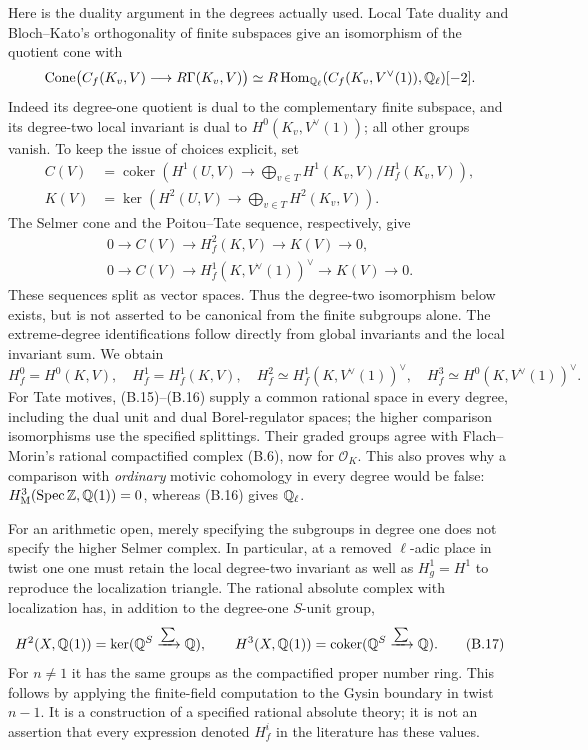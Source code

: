 Here is the duality argument in the degrees actually used.  Local
Tate duality and Bloch--Kato's orthogonality of finite subspaces
give an isomorphism of the quotient cone with
\[
 \operatorname{Cone}\bigl(C_f(K_v,V)\longrightarrow
   R\Gamma(K_v,V)\bigr)
 \simeq R\operatorname{Hom}_{\mathbb Q_\ell}
       (C_f(K_v,V^\vee(1)),\mathbb Q_\ell)[-2].
\]
Indeed its degree-one quotient is dual to the complementary finite
subspace, and its degree-two local invariant is dual to
\(H^0(K_v,V^\vee(1))\); all other groups vanish.
To keep the issue of choices explicit, set
\[
\begin{split}
 C(V)&=\operatorname{coker}\left(H^1(U,V)\longrightarrow
       \bigoplus_{v\in T}H^1(K_v,V)/H^1_f(K_v,V)\right),\\
 K(V)&=\ker\left(H^2(U,V)\longrightarrow
       \bigoplus_{v\in T}H^2(K_v,V)\right).
\end{split}
\]
The Selmer cone and the Poitou--Tate sequence, respectively, give
\[
\begin{gathered}
0\longrightarrow C(V)\longrightarrow H_f^2(K,V)
 \longrightarrow K(V)\longrightarrow0,\\
0\longrightarrow C(V)\longrightarrow
 H_f^1(K,V^\vee(1))^\vee
 \longrightarrow K(V)\longrightarrow0.
\end{gathered}
\]
These sequences split as vector spaces.  Thus the degree-two
isomorphism below exists, but is not asserted to be canonical
from the finite subgroups alone.  The extreme-degree
identifications follow directly from global invariants and the
local invariant sum.  We obtain
\[
 H_f^0=H^0(K,V),\quad H_f^1=H_f^1(K,V),\quad
 H_f^2\simeq H_f^1(K,V^\vee(1))^\vee,\quad
 H_f^3\simeq H^0(K,V^\vee(1))^\vee.\tag{B.16}
\]
For Tate motives, (B.15)--(B.16) supply a common rational space in
every degree, including the dual unit and dual Borel-regulator spaces;
the higher comparison isomorphisms use the specified splittings.
Their graded groups agree with Flach--Morin's rational compactified
complex (B.6), now for \(\mathcal O_K\).  This also proves why a comparison with
\emph{ordinary} motivic cohomology in every degree would be false:
\(H^3_{\mathrm M}(\operatorname{Spec}\mathbb Z,\mathbb Q(1))=0\), whereas (B.16) gives \(\mathbb Q_\ell\).

For an arithmetic open, merely specifying the subgroups in degree one
does not specify the higher Selmer complex.  In particular, at a
removed \(\ell\)-adic place in twist one one must retain the local
degree-two invariant as well as \(H^1_g=H^1\) to reproduce the
localization triangle.  The rational absolute complex with localization
has, in addition to the degree-one \(S\)-unit group,
\[
 H^2(X,\mathbb Q(1))=\ker(\mathbb Q^S\xrightarrow{\sum}\mathbb Q),\qquad
 H^3(X,\mathbb Q(1))=\operatorname{coker}(\mathbb Q^S\xrightarrow{\sum}\mathbb Q).
 \tag{B.17}
\]
For \(n\ne1\) it has the same groups as the compactified proper
number ring.  This follows by applying the finite-field computation
to the Gysin boundary in twist \(n-1\).  It is a construction of
a specified rational absolute theory; it is not an assertion that
every expression denoted \(H^i_f\) in the literature has these values.

